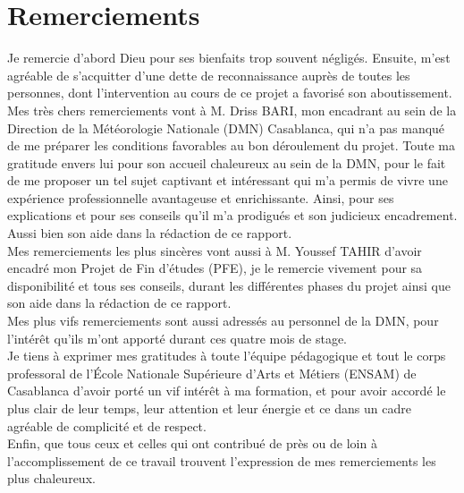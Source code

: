 \chapter*{Remerciements}
\mtcaddchapter[Remerciements]
\label{chap:Remerciements}
Je remercie d’abord Dieu pour ses bienfaits trop souvent négligés. Ensuite,  m’est agréable de s'acquitter d'une dette de reconnaissance auprès de toutes les personnes, dont l'intervention au cours de ce projet a favorisé son aboutissement.\\


Mes très chers remerciements vont à M. Driss BARI, mon encadrant au sein de la Direction de la Météorologie Nationale (DMN) Casablanca, qui n’a pas manqué de me préparer les conditions favorables au bon déroulement du projet. Toute ma gratitude envers lui pour son  accueil chaleureux au sein de la DMN, pour le fait de me proposer un tel sujet captivant et intéressant qui m'a permis de vivre une expérience professionnelle avantageuse et enrichissante. Ainsi, pour ses explications et pour ses conseils qu’il m'a prodigués et son judicieux encadrement. Aussi bien son aide dans la rédaction de ce rapport.\\


Mes remerciements les plus sincères vont aussi à M. Youssef TAHIR d'avoir encadré mon Projet de Fin d'études (PFE), je le remercie vivement pour sa disponibilité et tous ses conseils, durant les différentes phases du projet ainsi que son aide dans la rédaction de ce rapport.\\


Mes plus vifs remerciements sont aussi adressés au personnel de la DMN, pour l'intérêt qu'ils m'ont apporté durant ces quatre mois de stage.\\


Je tiens à exprimer mes gratitudes à toute l’équipe pédagogique et tout le corps professoral de l'École Nationale Supérieure d'Arts et Métiers (ENSAM) de Casablanca d'avoir porté un vif intérêt à ma formation, et pour avoir accordé le plus clair de leur temps, leur attention et leur énergie et ce dans un cadre agréable de complicité et de respect.\\


Enfin, que tous ceux et celles qui ont contribué de près ou de loin à l'accomplissement de ce travail trouvent l'expression de mes remerciements les plus chaleureux.
